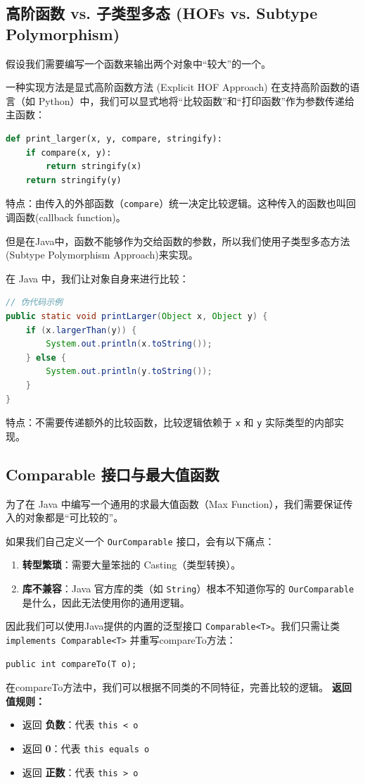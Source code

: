 \documentclass[12pt, a4paper, openany]{ctexbook} %
\begin{document}
\subsection{高阶函数 vs. 子类型多态 (HOFs vs. Subtype Polymorphism)}
假设我们需要编写一个函数来输出两个对象中“较大”的一个。
\par
一种实现方法是显式高阶函数方法 (Explicit HOF Approach)
在支持高阶函数的语言（如 Python）中，我们可以显式地将“比较函数”和“打印函数”作为参数传递给主函数：
\begin{lstlisting}[language=Python]
def print_larger(x, y, compare, stringify):
    if compare(x, y):
        return stringify(x)
    return stringify(y)
\end{lstlisting}
特点：由传入的外部函数（\texttt{compare}）统一决定比较逻辑。这种传入的函数也叫回调函数(callback function)。
\par
但是在Java中，函数不能够作为交给函数的参数，所以我们使用子类型多态方法 (Subtype Polymorphism Approach)来实现。
\par
在 Java 中，我们让对象自身来进行比较：
\begin{lstlisting}[language=Java]
// 伪代码示例
public static void printLarger(Object x, Object y) {
    if (x.largerThan(y)) {
        System.out.println(x.toString());
    } else {
        System.out.println(y.toString());
    }
}
\end{lstlisting}
\par
特点：不需要传递额外的比较函数，比较逻辑依赖于 \texttt{x} 和 \texttt{y} 实际类型的内部实现。

\subsection{Comparable 接口与最大值函数}
为了在 Java 中编写一个通用的求最大值函数（Max Function），我们需要保证传入的对象都是“可比较的”。
\par
如果我们自己定义一个 \texttt{OurComparable} 接口，会有以下痛点：
\begin{enumerate}
    \item \textbf{转型繁琐}：需要大量笨拙的 Casting（类型转换）。
    \item \textbf{库不兼容}：Java 官方库的类（如 \texttt{String}）根本不知道你写的 \texttt{OurComparable} 是什么，因此无法使用你的通用逻辑。
\end{enumerate}


因此我们可以使用Java提供的内置的泛型接口 \texttt{Comparable<T>}。我们只需让类 \texttt{implements Comparable<T>} 并重写compareTo方法：
\begin{lstlisting}
public int compareTo(T o);
\end{lstlisting}
\par
在compareTo方法中，我们可以根据不同类的不同特征，完善比较的逻辑。
\textbf{返回值规则：}
\begin{itemize}
    \item 返回 \textbf{负数}：代表 \texttt{this < o}
    \item 返回 \textbf{0}：代表 \texttt{this equals o}
    \item 返回 \textbf{正数}：代表 \texttt{this > o}
\end{itemize}
\end{document}
